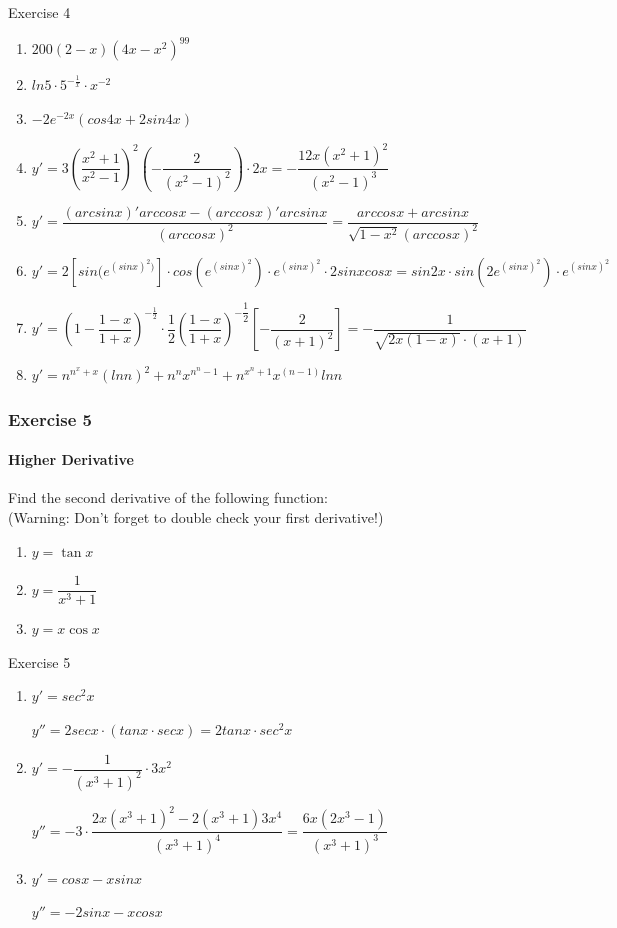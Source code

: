 \documentclass{beamer}
\begin{document}
\begin{frame}{Exercise 4}
    \begin{enumerate}
        \item $200(2-x)(4x-x^2)^{99}$
        \item $ln5\cdot5^{-\frac{1}{x}}\cdot x^{-2}$
        \item $-2e^{-2x}(cos4x + 2sin4x)$
        \item $y' = 3(\dfrac{x^2+1}{x^2-1})^2(-\dfrac{2}{(x^2 - 1)^2})\cdot 2x = -\dfrac{12x(x^2+1)^2}{(x^2-1)^3}$
        \item $y' = \dfrac{(arcsinx)'arccosx - (arccosx)'arcsinx}{(arccosx)^2} = \dfrac{arccosx + arcsinx}{\sqrt{1-x^2}(arccosx)^2}$
        \item $y' = 2[sin(e^{(sinx)^2)}]\cdot cos(e^{(sinx)^2}) \cdot e^{(sinx)^2} \cdot 2sinxcosx = sin2x \cdot sin(2e^{(sinx)^2})\cdot e^{(sinx)^2}$
        \item $y' = (1-\dfrac{1-x}{1+x})^{-\frac{1}{2}}\cdot \dfrac{1}{2}(\dfrac{1-x}{1+x})^{-\dfrac{1}{2}}[-\dfrac{2}{(x+1)^2}] = -\dfrac{1}{\sqrt{2x(1-x)}\cdot (x+1)}$
        \item $y' = n^{n^x + x}(lnn)^2 + n^nx^{n^n -1} + n^{x^n + 1}x^{(n-1)}lnn$
    \end{enumerate}
\end{frame}

\begin{frame}
		\frametitle{Exercise 5}
		\framesubtitle{Higher Derivative}
		Find the second derivative of the following function:\\
		(\alert{Warning}: Don't forget to double check your first derivative!)
		\begin{enumerate}
			\item $y = \tan{x}$
			\item $y = \dfrac{1}{x^{3} + 1}$
			\item $y = x\cos{x}$
		\end{enumerate}
	\end{frame}
	
\begin{frame}{Exercise 5}
\begin{enumerate}
    \item $y' = sec^2x$
    
    $y'' = 2secx \cdot (tanx \cdot secx) = 2tanx \cdot sec^2x$
    \item $y' = -\dfrac{1}{(x^3 + 1)^2}\cdot 3x^2$
    
    $y'' = -3 \cdot \dfrac{2x(x^3+1)^2 - 2(x^3+1)3x^4}{(x^3 + 1)^4} = \dfrac{6x(2x^3 - 1)}{(x^3 + 1)^3}$
    \item $y' = cosx - xsinx$
    
    $y'' = -2sinx - xcosx$
\end{enumerate}
\end{frame}
\end{document}
